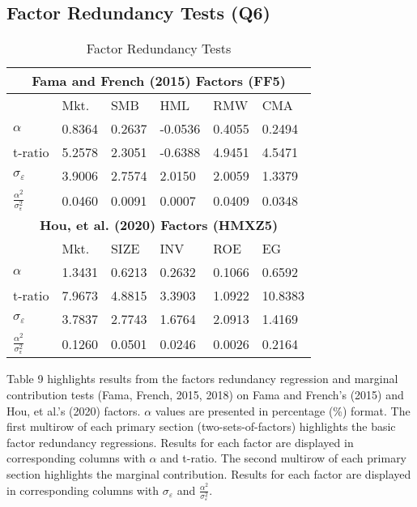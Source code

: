 \documentclass[11pt, english]{article}
\begin{document}
\newpage 

	\subsection{Factor Redundancy Tests (Q6)}

\begin{table}[h]
	\scriptsize
	\renewcommand{\arraystretch}{1.25}
\begin{center}
\begin{tabular}{ p{1.5cm} | p{1.5cm} p{1.5cm} p{1.5cm} p{1.5cm} p{1.5cm} }
        \hline
        \hline
        \multicolumn{6}{c}{\textbf{Fama and French (2015) Factors (FF5)}}\\
        \hline
        \hline
        & Mkt. & SMB & HML & RMW & CMA\\
        \hline
        $\alpha$ & 0.8364 & 0.2637 & -0.0536 & 0.4055 & 0.2494\\
        t-ratio & 5.2578 & 2.3051 & -0.6388 & 4.9451 & 4.5471\\
        \hline
        $\sigma_{\varepsilon}$ & 3.9006 & 2.7574 & 2.0150 & 2.0059 & 1.3379\\
        $\frac{\alpha^2}{\sigma_{\varepsilon}^2}$ & 0.0460 & 0.0091 & 0.0007 & 0.0409 & 0.0348\\
        \hline
        \hline
        \multicolumn{6}{c}{\textbf{Hou, et al. (2020) Factors (HMXZ5)}}\\
        \hline
        \hline
        & Mkt. & SIZE & INV & ROE & EG\\
        \hline
        $\alpha$ & 1.3431 & 0.6213 & 0.2632 & 0.1066 & 0.6592\\
        t-ratio & 7.9673 & 4.8815 & 3.3903 & 1.0922 & 10.8383\\
        \hline
        $\sigma_{\varepsilon}$ & 3.7837 & 2.7743 & 1.6764 & 2.0913 & 1.4169\\
        $\frac{\alpha^2}{\sigma_{\varepsilon}^2}$ & 0.1260 & 0.0501 & 0.0246 & 0.0026 & 0.2164\\
        \hline
\end{tabular}
        \caption{Factor Redundancy Tests}
\end{center}
\end{table}

Table 9 highlights results from the factors redundancy regression and marginal contribution tests (Fama, French, 2015, 2018) on Fama and French's (2015) and Hou, et al.'s (2020) factors. $\alpha$ values are presented in percentage (\%) format. The first multirow of each primary section (two-sets-of-factors) highlights the basic factor redundancy regressions. Results for each factor are displayed in corresponding columns with $\alpha$ and t-ratio. The second multirow of each primary section highlights the marginal contribution. Results for each factor are displayed in corresponding columns with $\sigma_{\varepsilon}$ and $\frac{\alpha^2}{\sigma_{\varepsilon}^2}$.\\
\end{document}
